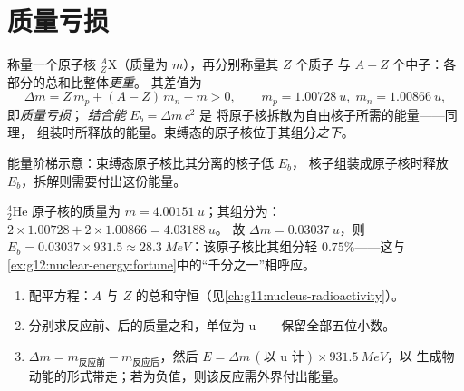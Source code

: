 \section{质量亏损}

\begin{definition}[质量亏损与结合能]\label{def:g12:nuclear-energy:defect}
称量一个原子核 ${}^{A}_{Z}\mathrm{X}$（质量为 $m$），再分别称量其 $Z$ 个质子
与 $A - Z$ 个中子：各部分的总和比整体\emph{更重}。
其差值为
\[
\Delta m = Z\,m_p + (A - Z)\,m_n - m > 0,
\qquad m_p = \qty{1.00728}{u},\; m_n = \qty{1.00866}{u},
\]
即\emph{质量亏损}；
\emph{结合能} $E_b = \Delta m\,c^2$ 是
将原子核拆散为自由核子所需的能量——同理，
组装时所释放的能量。束缚态的原子核位于其组分\emph{之下}。
\end{definition}

\begin{omfigure}

{\small 能量阶梯示意：束缚态原子核比其分离的核子低 $E_b$，
核子组装成原子核时释放 $E_b$，拆解则需要付出这份能量。}
\end{omfigure}

\begin{example}[氦-4]\label{ex:g12:nuclear-energy:helium}
${}^{4}_{2}\mathrm{He}$ 原子核的质量为 $m = \qty{4.00151}{u}$；其组分为：
$2 \times 1.00728 + 2 \times 1.00866 = \qty{4.03188}{u}$。
故 $\Delta m = \qty{0.03037}{u}$，则 $E_b = 0.03037 \times 931.5 \approx
\qty{28.3}{MeV}$：该原子核比其组分轻 $0.75\%$——这与
\cref{ex:g12:nuclear-energy:fortune}中的“千分之一”相呼应。
\end{example}

\begin{method}[核反应的能量平衡]\label{met:g12:nuclear-energy:balance}
\begin{enumerate}
  \item 配平方程：$A$ 与 $Z$ 的总和守恒（见\cref{ch:g11:nucleus-radioactivity}）。
  \item 分别求反应前、后的质量之和，单位为 \unit{u}——保留全部五位小数。
  \item $\Delta m = m_{\text{反应前}} - m_{\text{反应后}}$，然后
        $E = \Delta m\,(\text{以 u 计}) \times \qty{931.5}{MeV}$，以
        生成物动能的形式带走；若为负值，则该反应需外界付出能量。
\end{enumerate}
\end{method}

